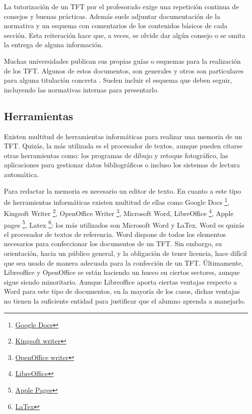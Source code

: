 \documentclass[12pt,spanish,chapterprefix, numbers=noenddot]{book}
\numberwithin{equation}{section}
\numberwithin{figure}{section}
\begin{document}
    La tutorización de un TFT por el profesorado exige una repetición
    continua de consejos y buenas prácticas. Además suele adjuntar documentación
    de la normativa y un esquema con comentarios de los contenidos básicos
    de cada sección. Esta reiteración hace que, a veces, se olvide dar
    algún consejo o se omita la entrega de alguna información.

    Muchas universidades publican sus propias guías o esquemas para la
    realización de los TFT. Algunos de estos documentos, son generales
    \cite{DeustoTFG,NebrijaTFG} y otros son particulares para alguna
    titulación concreta \cite{UCAMTurismo,SevillaDerechoyTrabajo,URJCJuridicas}.
    Suelen incluir el esquema que deben seguir, incluyendo las normativas
    internas para presentarlo.

    \subsection{Herramientas}

    Existen multitud de herramientas informáticas para realizar una memoria
    de un TFT. Quizás, la más utilizada es el procesador de textos, aunque
    pueden citarse otras herramientas como: los programas de dibujo y
    retoque fotográfico, las aplicaciones para gestionar datos bibliográficos
    o incluso los sistemas de lectura automática.

    Para redactar la memoria es necesario un editor de texto. En cuanto
    a este tipo de herramientas informáticas existen multitud de ellas
    como Google Docs \footnote{\href{https://docs.google.com/}{Google Docs}},
    Kingsoft Writer \footnote{\href{http://www.kingsoftstore.com/writer-free.html}{Kingsoft writer}},
    OpenOffice Writer \footnote{\href{https://www.openoffice.org/es/producto/writer.html}{OpenOffice writer}},
    Microsoft Word, LibreOffice \footnote{\href{https://es.libreoffice.org/}{LibreOffice}},
    Apple pages \footnote{\href{https://www.apple.com/pages/}{Apple Pages}},
    Latex \footnote{\href{https://www.latex-project.org/}{LaTex}}: los
    más utilizados son Microsoft Word y LaTex. Word es quizás el procesador
    de textos de referencia. Word dispone de todos los elementos
    necesarios para confeccionar los documentos de un TFT. Sin embargo,
    su orientación, hacia un público general, y la obligación de tener
    licencia, hace difícil que sea usado de manera adecuada para la confección
    de un TFT. Últimamente, Libreoffice y OpenOffice
    se están haciendo un hueco en ciertos sectores, aunque sigue siendo
    minoritario. Aunque Libreoffice aporta ciertas
    ventajas respecto a Word para este tipo de documentos, en la mayoría
    de los casos, dichas ventajas no tienen la suficiente entidad para
    justificar que el alumno aprenda a manejarlo.
\end{document}
